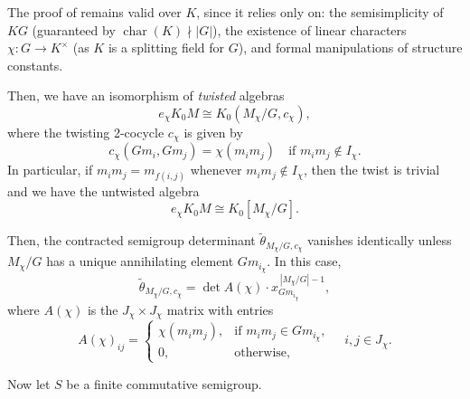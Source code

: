 \documentclass[11pt,reqno]{amsart}
\theoremstyle{plain}
\theoremstyle{remark}
\theoremstyle{definition}
\begin{document}
The proof of \cite[Proposition~6.9]{Ste-Fac-det} remains valid over $K$, since it relies only on:
the semisimplicity of $KG$ (guaranteed by $\operatorname{char}(K)\nmid |G|$),
the existence of linear characters $\chi : G \to K^\times$ (as $K$ is a splitting field for $G$),
and formal manipulations of structure constants.

Then, we have an isomorphism of \emph{twisted} algebras
\begin{equation}\label{twisted}
e_{\chi} K_0 M \cong K_0(M_{\chi}/G, c_{\chi}),
\end{equation}
where the twisting 2-cocycle \(c_{\chi}\) is given by
\[
c_{\chi}(G m_i, G m_j) = \chi(m_i m_j) \quad \text{if } m_i m_j \notin I_{\chi}.
\]
In particular, if \(m_i m_j = m_{f(i,j)}\) whenever \(m_i m_j \notin I_{\chi}\), then the twist is trivial and we have the untwisted algebra
\[
e_{\chi} K_0 M \cong K_0[M_{\chi}/G].
\]

Then, the contracted semigroup determinant
\(
\widetilde{\theta}_{M_{\chi}/G, c_{\chi}}
\)
vanishes identically unless $M_{\chi}/G$ has a unique annihilating element $G m_{i_{\chi}}$.
In this case,
\[
\widetilde{\theta}_{M_{\chi}/G, c_{\chi}} 
= \det A(\chi) \cdot x_{G m_{i_{\chi}}}^{\,|M_{\chi}/G|-1},
\]
where $A(\chi)$ is the $J_{\chi} \times J_{\chi}$ matrix with entries
\[
A(\chi)_{ij} =
\begin{cases}
\chi(m_i m_j), & \text{if } m_i m_j \in G m_{i_{\chi}}, \\
0, & \text{otherwise},
\end{cases}
\quad i,j \in J_{\chi}.
\]

Now let $S$ be a finite commutative semigroup. 
%
%
%
%
\end{document}
